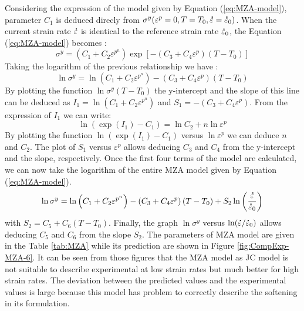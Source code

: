 \documentclass[twoside,english,1p,final,sort&compress]{elsarticle}
\theoremstyle{plain}
\newcommand{\mdot}[1]{\accentset{\mbox{\bfseries .}}{#1}}
\begin{document}
Considering the expression of the model given by Equation (\ref{eq:MZA-model}), parameter $C_1$ is deduced direcly from $\sigma^y(\varepsilon^p=0,T=T_0,\mdot\varepsilon=\mdot{\varepsilon}_0)$.
When the current strain rate $\mdot\varepsilon$ is identical to the reference strain rate $\mdot{\varepsilon}_0$, the Equation (\ref{eq:MZA-model}) becomes :
\begin{equation}
\sigma^y = \left(C_{1}+C_{2}\varepsilon^{p^n}\right) \exp\left[-\left(C_{3}+C_{4}\varepsilon^p\right)\left(T-T_0\right)\right]
\end{equation}
Taking the logarithm of the previous relationship we have :
\begin{equation}
\ln\sigma^y = \ln\left(C_{1}+C_{2}\varepsilon^{p^n}\right)-\left(C_{3}+C_{4}\varepsilon^p\right)\left(T-T_0\right)
\end{equation}
By plotting the function $\ln\sigma^y\left(T-T_0\right)$ the y-intercept and the slope of this line can be deduced as $I_1=\ln\left(C_1+C_2\varepsilon^{p^n}\right)$ and $S_1=-\left(C_3+C_4\varepsilon^p\right)$.
From the expression of $I_1$ we can write:
\begin{equation}
\ln\left(\exp(I_1)-C_1\right) = \ln C_2+n\ln\varepsilon^p
\end{equation}
By plotting the function $\ln\left(\exp(I_1)-C_1\right)$ versus $\ln\varepsilon^p$ we can deduce $n$ and $C_2$.
The plot of $S_1$ versus $\varepsilon^p$ allows deducing $C_3$ and $C_4$ from the y-intercept and the slope, respectively.
Once the first four terms of the model are calculated, we can now take the logarithm of the entire MZA model given by Equation (\ref{eq:MZA-model}).
\begin{equation}
\ln\sigma^y = \ln\left(C_{1}+C_{2}\varepsilon^{p^n}\right) - \left(C_{3}+C_{4}\varepsilon^p\right)\left(T-T_0\right) + S_2\ln\left( \frac{\mdot\varepsilon}{\mdot{\varepsilon}_0}\right)
\end{equation}
with $S_2=C_5+C_6\left(T-T_0\right)$.
Finally, the graph $\ln\sigma^y$ versus $ \ln(\mdot\varepsilon/\mdot{\varepsilon}_0)$ allows deducing $C_5$ and $C_6$ from the slope $S_2$.
The parameters of MZA model are given in the Table \ref{tab:MZA} while its prediction are shown in Figure \ref{fig:CompExp-MZA-6}.
It can be seen from those figures that the MZA model as JC model is not suitable to describe experimental at low strain rates but much better for high strain rates.
The deviation between the predicted values and the experimental values is large because this model has problem to correctly describe the softening in its formulation.
\end{document}
